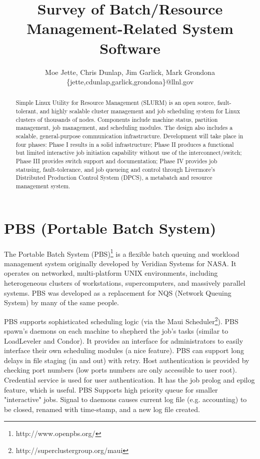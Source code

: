 \documentclass{article}
\author{Moe Jette, Chris Dunlap, Jim Garlick, Mark Grondona\\
        \{jette,cdunlap,garlick,grondona\}@llnl.gov}
\title{Survey of Batch/Resource Management-Related System Software}
\begin{document}
\maketitle

\begin{abstract}
Simple Linux Utility for Resource Management (SLURM) is an open source,
fault-tolerant, and highly scalable cluster management and job
scheduling system for Linux clusters of
thousands of nodes.  Components include machine status, partition
management, job management, and scheduling modules.  The design also
includes a scalable, general-purpose communication infrastructure.
Development will take place in four phases:  Phase I results in a solid
infrastructure;  Phase II produces a functional but limited interactive
job initiation capability without use of the interconnect/switch;
Phase III provides switch support and documentation; Phase IV provides
job statusing, fault-tolerance, and job queueing and control through
Livermore's Distributed Production Control System (DPCS), a metabatch and
resource management system.
\end{abstract}

\vspace{0.25in}

\section{PBS (Portable Batch System)}

The Portable Batch System (PBS)\footnote{http://www.openpbs.org/}
is a flexible batch queuing and
workload management system originally developed by Veridian Systems
for NASA.  It operates on networked, multi-platform UNIX environments,
including heterogeneous clusters of workstations, supercomputers, and
massively parallel systems. PBS was developed as a replacement for
NQS (Network Queuing System) by many of the same people.

PBS supports sophisticated scheduling logic (via the Maui
Scheduler\footnote{http://superclustergroup.org/maui}).
PBS spawn's daemons on each
machine to shepherd the job's tasks (similar to LoadLeveler
and Condor). It provides an interface for administrators to easily
interface their own scheduling modules (a nice feature).  PBS can support
long delays in file staging (in and out) with retry.  Host
authentication is provided by checking port numbers (low ports numbers are only
accessible to user root).  Credential service is used for user authentication.
It has the job prolog and epilog feature, which is useful.  PBS Supports
high priority queue for smaller "interactive" jobs.  Signal to daemons
causes current log file (e.g. accounting) to be closed, renamed with
time-stamp, and a new log file created.
\end{document}
